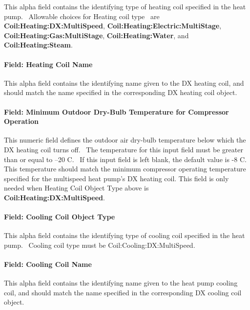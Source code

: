 This alpha field contains the identifying type of heating coil specified in the heat pump.~ Allowable choices for Heating coil type~ are \textbf{Coil:Heating:DX:MultiSpeed}, \textbf{Coil:Heating:Electric:MultiStage}, \textbf{Coil:Heating:Gas:MultiStage}, \textbf{Coil:Heating:Water}, and~ \textbf{Coil:Heating:Steam}.

\paragraph{Field: Heating Coil Name}\label{field-heating-coil-name-4}

This alpha field contains the identifying name given to the DX heating coil, and should match the name specified in the corresponding DX heating coil object.

\paragraph{Field: Minimum Outdoor Dry-Bulb Temperature for Compressor Operation}\label{field-minimum-outdoor-dry-bulb-temperature-for-compressor-operation-000}

This numeric field defines the outdoor air dry-bulb temperature below which the DX heating coil turns off.~ The temperature for this input field must be greater than or equal to --20 C.~ If this input field is left blank, the default value is -8 C. This temperature should match the minimum compressor operating temperature specified for the multispeed heat pump's DX heating coil. This field is only needed when Heating Coil Object Type above is \textbf{Coil:Heating:DX:MultiSpeed}.

\paragraph{Field: Cooling Coil Object Type}\label{field-cooling-coil-object-type-4}

This alpha field contains the identifying type of cooling coil specified in the heat pump.~ Cooling coil type must be Coil:Cooling:DX:MultiSpeed.

\paragraph{Field: Cooling Coil Name}\label{field-cooling-coil-name-4}

This alpha field contains the identifying name given to the heat pump cooling coil, and should match the name specified in the corresponding DX cooling coil object.

